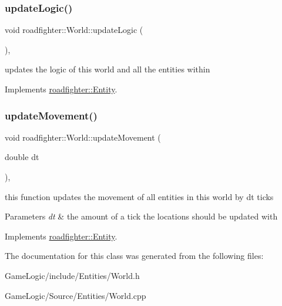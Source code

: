 \subsubsection{\texorpdfstring{update\+Logic()}{updateLogic()}}
{\footnotesize\ttfamily void roadfighter\+::\+World\+::update\+Logic (\begin{DoxyParamCaption}{ }\end{DoxyParamCaption})\hspace{0.3cm}{\ttfamily [override]}, {\ttfamily [virtual]}}

updates the logic of this world and all the entities within 

Implements \hyperlink{classroadfighter_1_1Entity_a54c00f1af306290bae3e4b84e196566b}{roadfighter\+::\+Entity}.

\mbox{\label{classroadfighter_1_1World_a880776b589376b1b4fd5ed4f26de4482}} 
\subsubsection{\texorpdfstring{update\+Movement()}{updateMovement()}}
{\footnotesize\ttfamily void roadfighter\+::\+World\+::update\+Movement (\begin{DoxyParamCaption}\item[{double}]{dt }\end{DoxyParamCaption})\hspace{0.3cm}{\ttfamily [override]}, {\ttfamily [virtual]}}

this function updates the movement of all entities in this world by dt ticks 
\begin{DoxyParams}{Parameters}
{\em dt} & the amount of a tick the locations should be updated with \\
\hline
\end{DoxyParams}


Implements \hyperlink{classroadfighter_1_1Entity_a66614a11004d6f9516473f60b530f689}{roadfighter\+::\+Entity}.



The documentation for this class was generated from the following files\+:\begin{DoxyCompactItemize}
\item 
Game\+Logic/include/\+Entities/World.\+h\item 
Game\+Logic/\+Source/\+Entities/World.\+cpp\end{DoxyCompactItemize}
